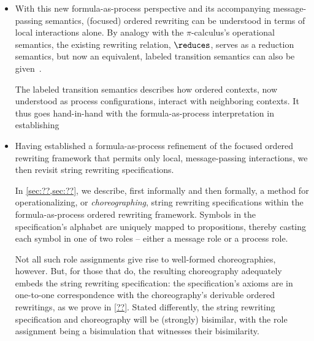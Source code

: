 \begin{itemize}[listparindent=\parindent, itemsep=\dimexpr\itemsep+\parsep\relax, parsep=0pt]
\item
  With this new formula-as-process perspective and its accompanying mes\-sage-passing semantics, (focused) ordered rewriting can be understood in terms of local interactions alone.
  By analogy with the $\pi$-calculus's operational semantics, the existing rewriting relation, $\reduces$, serves as a reduction semantics, but now an equivalent, labeled transition semantics can also be given~.

  The labeled transition semantics describes how ordered contexts, now understood as process configurations, interact with neighboring contexts.
  It thus goes hand-in-hand with the formula-as-process interpretation in establishing 

\item
  Having established a formula-as-process refinement of the focused ordered rewriting framework that permits only local, message-passing interactions, we then revisit string rewriting specifications.

  In \cref{sec:??,sec:??}, we describe, first informally and then formally, a method for operationalizing, or \emph{choreographing}, string rewriting specifications within the formula-as-process ordered rewriting framework.
  Symbols in the specification's alphabet are uniquely mapped to propositions, thereby casting each symbol in one of two roles -- either a message role or a process role.

  Not all such role assignments give rise to well-formed choreographies, however.
  But, for those that do, the resulting choreography adequately embeds the string rewriting specification:
  the specification's axioms are in one-to-one correspondence with the choreography's derivable ordered rewritings, as we prove in \cref{??}.
  Stated differently, the string rewriting specification and choreography will be (strongly) bisimilar, with the role assignment being a bisimulation that witnesses their bisimilarity.



\end{itemize}
